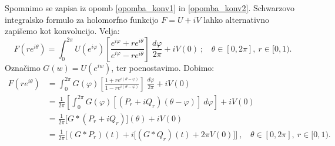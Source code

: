 \documentclass[mat1]{fmfdelo}
\begin{document}
    \begin{opomba}
        Spomnimo se zapisa iz opomb \ref{opomba_konv1} in \ref{opomba_konv2}. Schwarzovo integralsko formulo za holomorfno funkcijo $F = U + iV$ lahko alternativno zapišemo kot konvolucijo. Velja:
        $$
            F(r e^{i \theta}) = \int_{0}^{2 \pi}{U(e^{i \varphi})\left[\frac{e^{i \varphi}+r e^{i \theta}}{e^{i \varphi}-r e^{i \theta}}\right]~\frac{d \varphi}{2 \pi}} + i V(0)~;~~~~\theta \in [0,2 \pi],~r \in [0,1).
        $$
        Označimo $G(w) = U(e^{iw})$, ter poenostavimo. Dobimo:
        \begin{align*}
            F(r e^{i \theta}) & = \int_{0}^{2 \pi}{G(\varphi)\left[\frac{1 +r e^{i (\theta-\varphi)}}{1-r e^{i(\theta-\varphi)}}\right]}~\frac{d\varphi}{2 \pi} + iV(0)\\
            & = \frac{1}{2 \pi} \left[\int_{0}^{2 \pi}{G(\varphi)[(P_r + i Q_r)(\theta - \varphi)]}~d\varphi\right]+  iV(0) \\
            & = \frac{1}{2 \pi} \big[G * (P_r + iQ_r)\big](\theta) + iV(0)\\
            & = \frac{1}{2 \pi}\bigg[(G * P_r)(t) + i\big[(G * Q_r)(t) + 2 \pi V(0)\big]\bigg]~,~~~~\theta\in [0,2 \pi],~r \in [0,1).
        \end{align*}
    \end{opomba}
\end{document}
